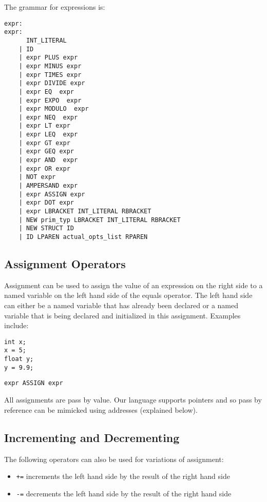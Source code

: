 \documentclass{article}
\begin{document}
The grammar for expressions is: 
\begin{Verbatim}[frame=single]
expr:
expr:
	  INT_LITERAL 	
	| ID 		
	| expr PLUS expr
	| expr MINUS expr
	| expr TIMES expr 
	| expr DIVIDE expr 	
	| expr EQ  expr 
	| expr EXPO  expr 
	| expr MODULO  expr 	
	| expr NEQ  expr 	
	| expr LT expr 		
	| expr LEQ  expr 
	| expr GT expr 		
	| expr GEQ expr 	
	| expr AND  expr 	
	| expr OR expr 		
	| NOT expr		
	| AMPERSAND expr	
	| expr ASSIGN expr
	| expr DOT expr 	
	| expr LBRACKET INT_LITERAL RBRACKET 	   
	| NEW prim_typ LBRACKET INT_LITERAL RBRACKET
	| NEW STRUCT ID 			
	| ID LPAREN actual_opts_list RPAREN          
\end{Verbatim}



\subsection{Assignment Operators}
Assignment can be used to assign the value of an expression on the right side to a named variable on the left hand side of the equals operator.  The left hand side can either be a named variable that has already been declared or a named variable that is being declared and initialized in this assignment.  Examples include:
\begin{lstlisting}
int x;
x = 5;
float y;
y = 9.9;
\end{lstlisting}

\begin{Verbatim}[frame=single]
 expr ASSIGN expr 
\end{Verbatim}

All assignments are pass by value. Our language supports pointers and so pass by reference can be mimicked using addresses (explained below).

\subsection{Incrementing and Decrementing}
The following operators can also be used for variations of assignment:

\begin{itemize}
\item \texttt{+=} increments the left hand side by the result of the right hand side
\item \texttt{-=} decrements the left hand side by the result of the right hand side
\end{itemize}
\end{document}

